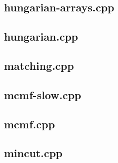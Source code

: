 \subsection{hungarian-arrays.cpp}


\subsection{hungarian.cpp}


\subsection{matching.cpp}


\subsection{mcmf-slow.cpp}


\subsection{mcmf.cpp}


\subsection{mincut.cpp}


